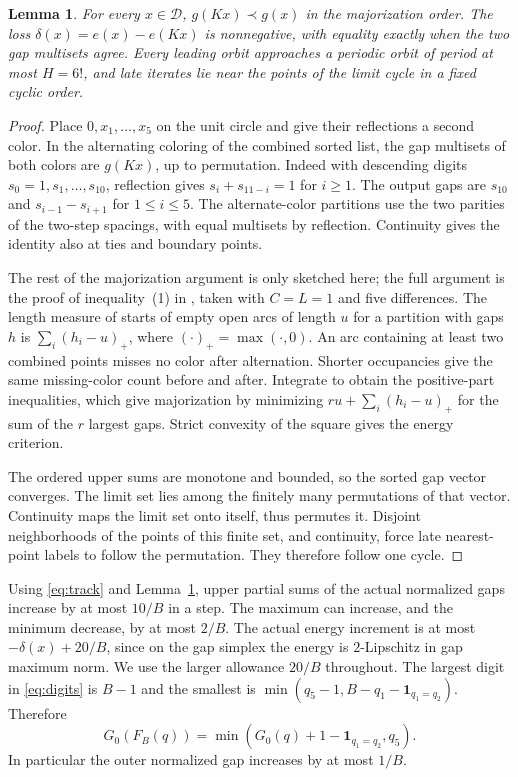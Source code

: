 \documentclass[11pt,reqno]{amsart}
\newtheorem{lemma}[theorem]{Lemma}
\theoremstyle{remark}
\begin{document}
\begin{lemma}\label{lem:leading}
For every \(x\in\mathcal D\), \(g(Kx)\prec g(x)\) in the majorization order. The loss \(\delta(x)=e(x)-e(Kx)\) is nonnegative, with equality exactly when the two gap multisets agree. Every leading orbit approaches a periodic orbit of period at most \(H=6!\), and late iterates lie near the points of the limit cycle in a fixed cyclic order.
\end{lemma}
\begin{proof}
Place \(0,x_1,\ldots,x_5\) on the unit circle and give their reflections a second color. In the alternating coloring of the combined sorted list, the gap multisets of both colors are \(g(Kx)\), up to permutation. Indeed with descending digits \(s_0=1,s_1,\ldots,s_{10}\), reflection gives \(s_i+s_{11-i}=1\) for \(i\ge1\). The output gaps are \(s_{10}\) and \(s_{i-1}-s_{i+1}\) for \(1\le i\le5\). The alternate-color partitions use the two parities of the two-step spacings, with equal multisets by reflection. Continuity gives the identity also at ties and boundary points.

The rest of the majorization argument is only sketched here; the full argument is the proof of inequality~(1) in \cite[Section~2]{G4}, taken with \(C=L=1\) and five differences. The length measure of starts of empty open arcs of length \(u\) for a partition with gaps \(h\) is \(\sum_i(h_i-u)_+\), where \((\cdot)_+=\max(\cdot,0)\). An arc containing at least two combined points misses no color after alternation. Shorter occupancies give the same missing-color count before and after. Integrate to obtain the positive-part inequalities, which give majorization by minimizing \(ru+\sum_i(h_i-u)_+\) for the sum of the \(r\) largest gaps. Strict convexity of the square gives the energy criterion.

The ordered upper sums are monotone and bounded, so the sorted gap vector converges. The limit set lies among the finitely many permutations of that vector. Continuity maps the limit set onto itself, thus permutes it. Disjoint neighborhoods of the points of this finite set, and continuity, force late nearest-point labels to follow the permutation. They therefore follow one cycle.
\end{proof}

Using \eqref{eq:track} and Lemma~\ref{lem:leading}, upper partial sums of the actual normalized gaps increase by at most \(10/B\) in a step. The maximum can increase, and the minimum decrease, by at most \(2/B\). The actual energy increment is at most \(-\delta(x)+20/B\), since on the gap simplex the energy is \(2\)-Lipschitz in gap maximum norm. We use the larger allowance \(20/B\) throughout. The largest digit in \eqref{eq:digits} is \(B-1\) and the smallest is \(\min(q_5-1,B-q_1-\mathbf1_{q_1=q_2})\). Therefore
\begin{equation}\label{eq:outer}
 G_0(F_B(q))=\min(G_0(q)+1-\mathbf1_{q_1=q_2},q_5).
\end{equation}
In particular the outer normalized gap increases by at most \(1/B\).
\end{document}
